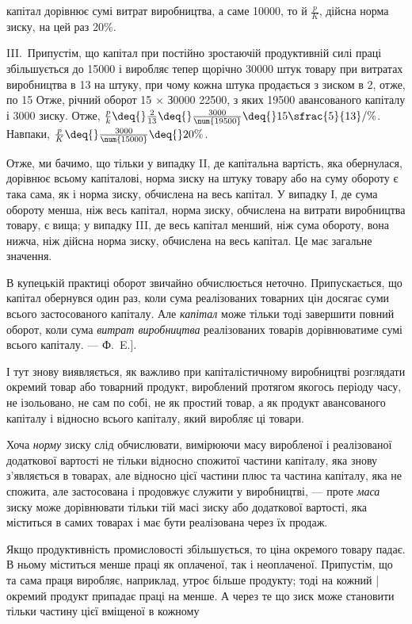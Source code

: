 \parcont{}  %
капітал дорівнює сумі витрат виробництва, а саме \num{10000}, то й $\frac{p}{K}$, дійсна норма
зиску, на цей раз \deq{} 20\%.

III.~Припустім, що капітал при постійно зростаючій продуктивній силі праці збільшується до \num{15000} і виробляє тепер щорічно \num{30000} штук товару при витратах виробництва в 13
на штуку, при чому кожна штука продається з зиском в 2, отже, по 15 Отже, річний
оборот \deq{} 15 × З0000 \deq{} \num{22500}, з яких \num{19500}
авансованого капіталу і 3000 зиску. Отже,
$\frac{p}{k} \deq{} \frac{2}{13} \deq{} \frac{3000}{\num{19500}} \deq{} 15\sfrac{5}{13}/\%$.
Навпаки, $\frac{p}{K} \deq{} \frac{3000}{\num{15000}} \deq{} 20\%$.

Отже, ми бачимо, що тільки у випадку II, де капітальна вартість, яка обернулася, дорівнює всьому
капіталові, норма зиску на штуку товару або на суму обороту є така сама, як і норма зиску, обчислена
на весь капітал. У випадку І, де сума обороту менша, ніж весь капітал, норма зиску, обчислена на
витрати виробництва товару, є вища; у випадку III, де весь капітал менший, ніж сума обороту, вона
нижча, ніж дійсна норма зиску, обчислена на весь капітал. Це має загальне значення.

В купецькій практиці оборот звичайно обчислюється неточно. Припускається, що капітал обернувся один
раз, коли сума реалізованих товарних цін досягає суми всього застосованого капіталу. Але \emph{капітал}
може тільки тоді завершити повний оборот, коли сума \emph{витрат виробництва} реалізованих товарів
дорівнюватиме сумі всього капіталу. — Ф.~E.].

І тут знову виявляється, як важливо при капіталістичному виробництві розглядати окремий товар або
товарний продукт, вироблений протягом якогось періоду часу, не ізольовано, не сам по собі, не як
простий товар, а як продукт авансованого капіталу і відносно всього капіталу, який виробляє ці
товари.

Хоча \emph{норму} зиску слід обчислювати, вимірюючи масу виробленої і реалізованої додаткової вартості не
тільки відносно спожитої частини капіталу, яка знову з’являється в товарах, але відносно цієї
частини плюс та частина капіталу, яка не спожита, але застосована і продовжує служити у виробництві,
— проте \emph{маса} зиску може дорівнювати тільки тій масі зиску або додаткової вартості, яка міститься в
самих товарах і має бути реалізована через їх продаж.

Якщо продуктивність промисловості збільшується, то ціна окремого товару падає. В ньому міститься
менше праці як оплаченої, так і неоплаченої. Припустім, що та сама праця виробляє, наприклад, утроє
більше продукту; тоді на кожний | окремий продукт припадає праці на  менше. А через те що зиск
може становити тільки частину цієї вміщеної в кожному
\parbreak{}  %
